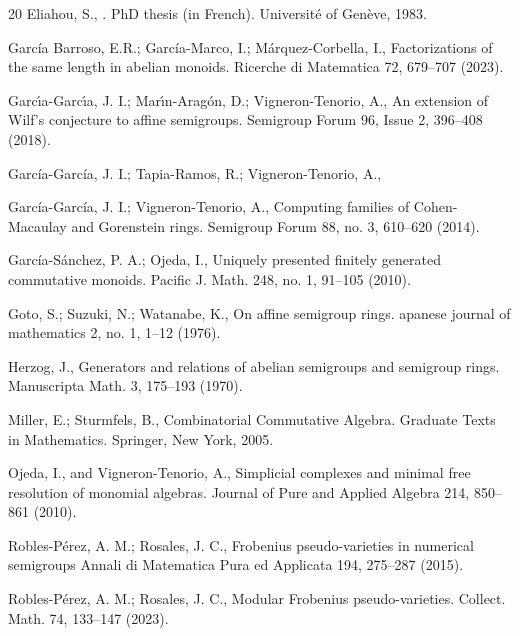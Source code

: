 \documentclass[a4paper,11pt]{article}
\begin{document}
{\begin{thebibliography}{20}
Eliahou, S.,
.
\newblock PhD thesis (in French). Universit\'{e} of Gen\`eve, 1983.

García Barroso, E.R.; García-Marco, I.; Márquez-Corbella, I.,
\newblock Factorizations of the same length in abelian monoids.
\newblock Ricerche di Matematica 72, 679–707 (2023).


Garc\'{\i}a-Garc\'{\i}a, J. I.; Mar\'{\i}n-Arag\'{o}n, D.; Vigneron-Tenorio, A.,
\newblock An extension of Wilf's conjecture to affine semigroups.
\newblock Semigroup Forum 96, Issue 2, 396--408 (2018).

García-García, J. I.; Tapia-Ramos, R.; Vigneron-Tenorio, A.,

García-García, J. I.;  Vigneron-Tenorio, A.,
\newblock Computing families of Cohen-Macaulay and Gorenstein rings.
\newblock Semigroup Forum 88, no. 3, 610–620 (2014).

García-Sánchez, P. A.; Ojeda, I.,
\newblock Uniquely presented finitely generated commutative monoids.
\newblock Pacific J. Math. 248, no. 1, 91--105 (2010).

Goto, S.; Suzuki, N.; Watanabe, K.,
\newblock On affine semigroup rings.
\newblock apanese journal of mathematics 2, no. 1, 1--12 (1976).

Herzog, J.,
\newblock Generators and relations of abelian semigroups and semigroup rings.
\newblock Manuscripta Math. 3, 175--193 (1970).

Miller, E.; Sturmfels, B.,
\newblock Combinatorial Commutative Algebra.
\newblock Graduate Texts in Mathematics. Springer, New York, 2005.

Ojeda, I., and Vigneron-Tenorio, A.,
\newblock Simplicial complexes and minimal free resolution of monomial algebras.
\newblock Journal of Pure and Applied Algebra 214, 850--861 (2010).

Robles-Pérez, A. M.; Rosales, J. C.,
\newblock Frobenius pseudo-varieties in numerical semigroups
\newblock Annali di Matematica Pura ed Applicata 194, 275--287 (2015).

Robles-Pérez, A. M.; Rosales, J. C.,
\newblock Modular Frobenius pseudo-varieties.
\newblock Collect. Math. 74, 133--147 (2023).


\end{thebibliography}}
\end{document}
